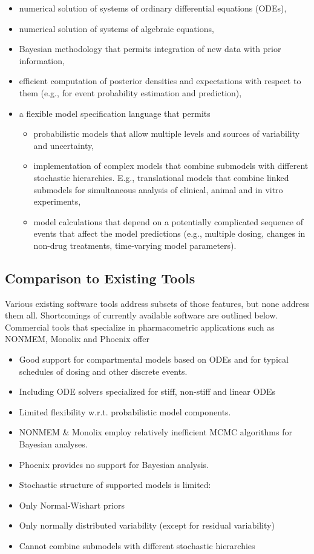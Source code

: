 \begin{itemize}
\item numerical solution of systems of ordinary differential equations
  (ODEs),
\item numerical solution of systems of algebraic equations,
\item Bayesian methodology that permits integration of new data with
  prior information,
\item efficient computation of posterior densities and expectations
  with respect to them (e.g., for event probability estimation and
  prediction),
\item a flexible model specification language that permits
\begin{itemize}
\item probabilistic models that allow multiple levels and sources of
  variability and uncertainty,
\item implementation of complex models that combine submodels with
  different stochastic hierarchies. E.g., translational models that
  combine linked submodels for simultaneous analysis of clinical,
  animal and in vitro experiments,
\item model calculations that depend on a
  potentially complicated sequence of events that affect the model
  predictions (e.g., multiple dosing, changes in non-drug treatments,
  time-varying model parameters).
\end{itemize}
\end{itemize}

\subsection{Comparison to Existing Tools}\label{existing}

Various existing software tools address subsets of those features, but
none address them all. Shortcomings of currently available software
are outlined below. Commercial tools that specialize in pharmacometric
applications such as NONMEM, Monolix and Phoenix offer

\begin{itemize}
\item Good support for compartmental models based on ODEs and for
  typical schedules of dosing and other discrete events.
\item Including ODE solvers specialized for stiff, non-stiff and
  linear ODEs
\item Limited flexibility w.r.t. probabilistic model components.
\item NONMEM \& Monolix employ relatively inefficient MCMC algorithms
  for Bayesian analyses.
\item Phoenix provides no support for Bayesian analysis.
\item Stochastic structure of supported models is limited:
\item Only Normal-Wishart priors
\item Only normally distributed variability (except for residual
  variability)
\item Cannot combine submodels with different stochastic hierarchies
\end{itemize}

